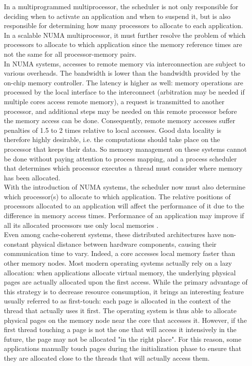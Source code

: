 \documentclass[a4paper,10pt]{article}
\begin{document}
\begin{multicols}{2}
In a multiprogrammed multiprocessor, the scheduler is not only responsible for deciding when to activate an application and when to suspend it, but is also responsible for determining how many processors to allocate to each application. In a scalable NUMA multiprocessor, it must further resolve the problem of which processors to allocate to which application since the memory reference times are not the same for all processor-memory pairs.\\
In NUMA systems, accesses to remote memory via interconnection are subject to various overheads. The bandwidth is lower than the bandwidth provided by the on-chip memory controller. The latency is higher as well: memory operations are processed by the local interface to the interconnect (arbitration may be needed if multiple cores access remote memory), a request is transmitted to another processor, and additional steps may be needed on this remote processor before the memory access can be done. Consequently, remote memory accesses suffer penalties of 1.5 to 2 times relative to local accesses. Good data locality is therefore highly desirable, i.e. the computations should take place on the processor that keeps their data. So memory management on these systems cannot be done without paying attention to process mapping, and a process scheduler that determines which processor executes a thread must consider where memory has been allocated.\\
With the introduction of NUMA systems, the scheduler now must also determine which processor(s) to allocate to which application. The relative positions of processors allocated to an application will affect the performance of it due to the difference in memory access times. Performance of an application may improve if all its allocated processors use only local memories \cite{Majo_memorysystem}.\\
Even among cache-coherent systems, these distributed architectures have non-constant physical distance between hardware components, causing their communication time to vary. Indeed, a core accesses local memory faster than other memory nodes. Most modern operating systems actually rely on a lazy allocation: when applications allocate virtual memory, the underlying physical pages are actually allocated upon the first access. While the primary advantage of this strategy is to decrease resource consumption, it brings an interesting feature usually referred to as first-touch: each page is allocated in the context of the thread that actually uses it first. The operating system is thus able to allocate physical pages on the memory node near the core that accesses it. However, if the first thread touching a page is not the one that will access it intensively in the future, the page may not be allocated "in the right place". For this reason, some applications manually touch pages during the initialization phase to ensure that they are allocated close to the threads that will actually access them.




\end{multicols}
\end{document}
